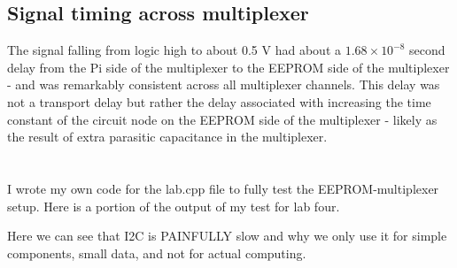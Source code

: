 \documentclass{article}
\begin{document}
\subsection{Signal timing across multiplexer}
The signal falling from logic high to about 0.5 V had about a $1.68 \times 10^{-8}$ second delay from the Pi side of the multiplexer to the EEPROM side of the multiplexer - and was remarkably consistent across all multiplexer channels. This delay was not a transport delay but rather the delay associated with increasing the time constant of the circuit node on the EEPROM side of the multiplexer - likely as the result of extra parasitic capacitance in the multiplexer.

\section{}
I wrote my own code for the lab.cpp file to fully test the EEPROM-multiplexer setup. Here is a portion of the output of my test for lab four.



Here we can see that I2C is PAINFULLY slow and why we only use it for simple components, small data, and not for actual computing.
\end{document}
